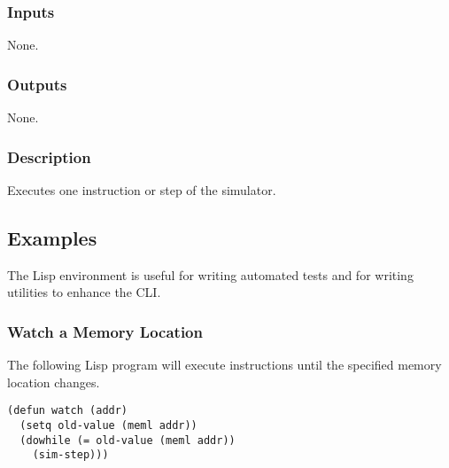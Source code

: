 \documentclass[10pt, openany]{book}
\begin{document}
\subsubsection{Inputs}
None.
\subsubsection{Outputs}
None.
\subsubsection{Description}
Executes one instruction or step of the simulator.

\subsection{Examples}
The Lisp environment is useful for writing automated tests and for writing utilities to enhance the CLI.
\subsubsection{Watch a Memory Location}
The following Lisp program will execute instructions until the specified memory location changes.
\lstset{language=[Tiny]Lisp}
\begin{lstlisting}
(defun watch (addr)
  (setq old-value (meml addr))
  (dowhile (= old-value (meml addr))
    (sim-step)))
\end{lstlisting}

\clearpage
{}
\nocite{m68000a}
\nocite{m68000b}
\nocite{i8080}


\end{document}
